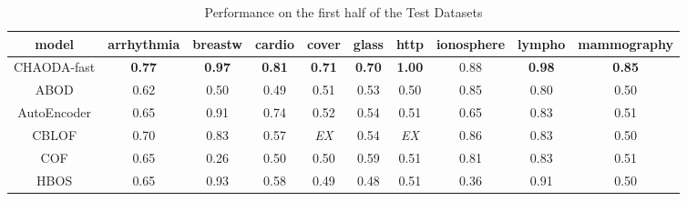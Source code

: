 
\begin{table*}[!t]
\renewcommand{\arraystretch}{1.25}
\caption{Performance on the first half of the Test Datasets}
\label{table:results:test-performance-1}
\centering
\begin{tabular}{|c|c|c|c|c|c|c|c|c|c|}
\hline
\textbf{\textbf{model}} & \textbf{\textbf{arrhythmia}} & \textbf{\textbf{breastw}} & \textbf{\textbf{cardio}} & \textbf{\textbf{cover}} & \textbf{\textbf{glass}} & \textbf{\textbf{http}} & \textbf{\textbf{ionosphere}} & \textbf{\textbf{lympho}} & \textbf{\textbf{mammography}} \\
\hline
                CHAODA-fast &                \textbf{0.77} &             \textbf{0.97} &            \textbf{0.81} &           \textbf{0.71} &           \textbf{0.70} &          \textbf{1.00} &                         0.88 &            \textbf{0.98} &                 \textbf{0.85} \\
\hline
                        ABOD &                         0.62 &                      0.50 &                     0.49 &                    0.51 &                    0.53 &                   0.50 &                         0.85 &                     0.80 &                          0.50 \\
\hline
                AutoEncoder &                         0.65 &                      0.91 &                     0.74 &                    0.52 &                    0.54 &                   0.51 &                         0.65 &                     0.83 &                          0.51 \\
\hline
                        CBLOF &                         0.70 &                      0.83 &                     0.57 &             \textit{EX} &                    0.54 &            \textit{EX} &                         0.86 &                     0.83 &                          0.50 \\
\hline
                        COF &                         0.65 &                      0.26 &                     0.50 &                    0.50 &                    0.59 &                   0.51 &                         0.81 &                     0.83 &                          0.51 \\
\hline
                        HBOS &                         0.65 &                      0.93 &                     0.58 &                    0.49 &                    0.48 &                   0.51 &                         0.36 &                     0.91 &                          0.50 \\

\end{tabular}
\end{table*}
